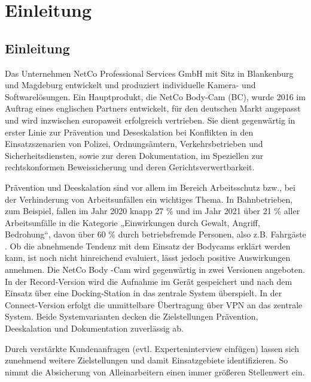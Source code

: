 \documentclass[thesis.tex]{subfiles}
\begin{document}
\chapter{Einleitung}
\label{chap:Einleitung}


\section{Einleitung}
Das Unternehmen NetCo Professional Services GmbH mit Sitz in Blankenburg und Magdeburg entwickelt und produziert individuelle Kamera- und Softwarelösungen.
Ein Hauptprodukt, die NetCo Body-Cam (BC), wurde 2016 im Auftrag eines englischen Partners entwickelt, für den deutschen Markt angepasst und wird inzwischen europaweit erfolgreich vertrieben.
Sie dient gegenwärtig in erster Linie zur Prävention und Deseskalation bei Konflikten in den Einsatzszenarien von Polizei, Ordnungsämtern, Verkehrsbetrieben und Sicherheitsdiensten, sowie zur deren Dokumentation, im Speziellen zur rechtskonformen Beweissicherung und deren Gerichtsverwertbarkeit.

Prävention und Deeskalation sind vor allem im Bereich Arbeitsschutz bzw., bei der Verhinderung von Arbeitsunfällen ein wichtiges Thema.
In Bahnbetrieben, zum Beispiel, fallen im Jahr 2020 knapp 27 \% und im Jahr 2021 über 21 \% aller Arbeitsunfälle in die Kategorie „Einwirkungen durch Gewalt, Angriff, Bedrohung“, davon über 60 \% durch betriebsfremde Personen, also z.B. Fahrgäste \cite[jeweils S.87 ff.]{Unfallgeschehen2020,Unfallgeschehen2021}.
Ob die abnehmende Tendenz mit dem Einsatz der Bodycams erklärt werden kann, ist noch nicht hinreichend evaluiert, lässt jedoch positive Auswirkungen annehmen.
Die NetCo Body -Cam wird gegenwärtig in zwei Versionen angeboten.
In der Record-Version wird die Aufnahme im Gerät gespeichert und nach dem Einsatz über eine Docking-Station in das zentrale System überspielt.
In der Connect-Version erfolgt die unmittelbare Übertragung über VPN an das zentrale System.
Beide Systemvarianten decken die Zielstellungen Prävention, Deeskalation und Dokumentation zuverlässig ab.

Durch verstärkte Kundenanfragen (evtl. Experteninterview einfügen) lassen sich zunehmend weitere Zielstellungen und damit Einsatzgebiete identifizieren.
So nimmt die Absicherung von Alleinarbeitern einen immer größeren Stellenwert ein.
\end{document}
